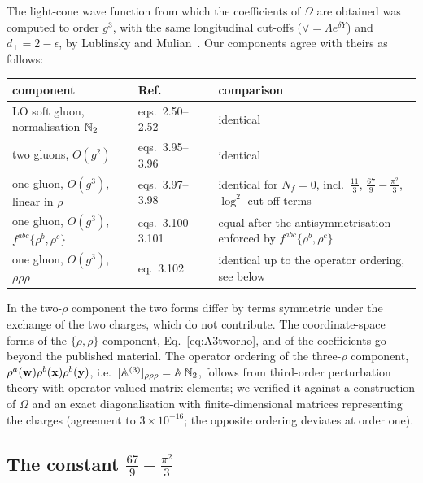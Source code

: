 The light-cone wave function from which the coefficients of $\Omega$ are obtained was computed to order $g^3$, with the same longitudinal cut-offs ($\vee=\Lambda e^{\delta Y}$) and $d_\perp=2-\epsilon$, by Lublinsky and Mulian~\cite{Lublinsky:2016meo}. Our components agree with theirs as follows:
\begin{center}
\renewcommand{\arraystretch}{1.2}
\small
\begin{tabular}{@{}p{4.6cm}p{2.3cm}p{6.6cm}@{}}
\toprule
component & Ref.~\cite{Lublinsky:2016meo} & comparison\\
\midrule
LO soft gluon, normalisation $\mathbb{N}_2$ & eqs.~2.50--2.52 & identical\\
two gluons, $O(g^2)$ & eqs.~3.95--3.96 & identical\\
one gluon, $O(g^3)$, linear in $\rho$ & eqs.~3.97--3.98 & identical for $N_f=0$, incl.\ $\frac{11}{3}$, $\frac{67}{9}-\frac{\pi^2}{3}$, $\log^2$ cut-off terms\\
one gluon, $O(g^3)$, $f^{abc}\{\rho^b,\rho^c\}$ & eqs.~3.100--3.101 & equal after the antisymmetrisation enforced by $f^{abc}\{\rho^b,\rho^c\}$\\
one gluon, $O(g^3)$, $\rho\rho\rho$ & eq.~3.102 & identical up to the operator ordering, see below\\
\bottomrule
\end{tabular}
\end{center}
In the two-$\rho$ component the two forms differ by terms symmetric under the exchange of the two charges, which do not contribute. The coordinate-space forms of the $\{\rho,\rho\}$ component, Eq.~\eqref{eq:A3tworho}, and of the coefficients go beyond the published material. The operator ordering of the three-$\rho$ component, $\rho^a(\mathbf{w})\rho^b(\mathbf{x})\rho^b(\mathbf{y})$, i.e.\ $[\mathbb{A}^{(3)}]_{\rho\rho\rho}=\mathbb{A}\,\mathbb{N}_2$, follows from third-order perturbation theory with operator-valued matrix elements; we verified it against a construction of $\Omega$ and an exact diagonalisation with finite-dimensional matrices representing the charges (agreement to $3\times10^{-16}$; the opposite ordering deviates at order one).

\subsection{The constant \texorpdfstring{$\frac{67}{9}-\frac{\pi^2}{3}$}{67/9-pi2/3}}\label{sec:lit_constant}

